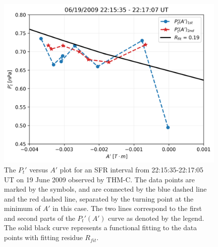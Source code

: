 \begin{figure}
    \centering
\includegraphics[width=\textwidth]{Figures/Reconstructions/PtvsA_20090619_20090621.png}
    \caption[$P_t'$ versus $A'$ plot for 22:15:35-22:17:05 UT on 19 June 2009]{The $P_t'$ versus $A'$ plot for an SFR interval from 22:15:35-22:17:05 UT on 19 June 2009 observed by THM-C. The data points are marked by the symbols, and are connected by the blue dashed line and the red dashed line, separated by the turning point at the minimum of $A'$ in this case. The two lines correspond to the first and second parts of the $P_t'(A')$ curve as denoted by the legend. The solid black curve represents a functional fitting to the data points with fitting residue $R_{fit}$.}
    \label{fig:Pt-vs-A}
\end{figure}


